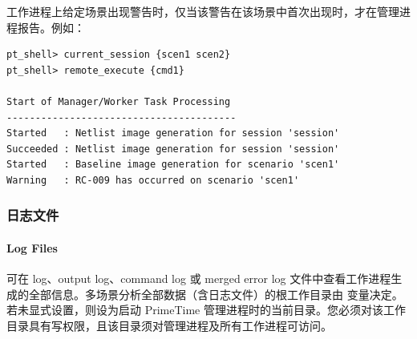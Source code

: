 工作进程上给定场景出现警告时，仅当该警告在该场景中首次出现时，才在管理进程报告。例如：
\begin{lstlisting}
pt_shell> current_session {scen1 scen2}
pt_shell> remote_execute {cmd1}

Start of Manager/Worker Task Processing
----------------------------------------
Started   : Netlist image generation for session 'session'
Succeeded : Netlist image generation for session 'session'
Started   : Baseline image generation for scenario 'scen1'
Warning   : RC-009 has occurred on scenario 'scen1'
\end{lstlisting}

\subsubsection{日志文件}
\paragraph*{Log Files}

可在 log、output log、command log 或 merged error log 文件中查看工作进程生成的全部信息。多场景分析全部数据（含日志文件）的根工作目录由  变量决定。若未显式设置，则设为启动 PrimeTime 管理进程时的当前目录。您必须对该工作目录具有写权限，且该目录须对管理进程及所有工作进程可访问。

